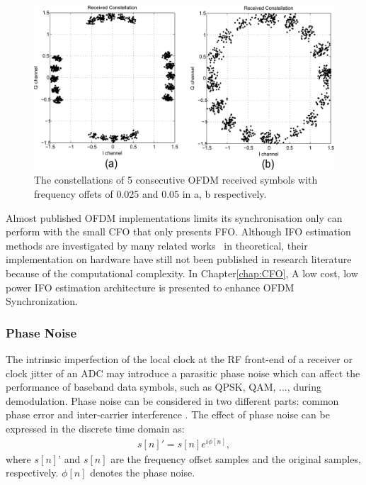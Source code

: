\begin{figure}
	\centerline{\includegraphics [width=0.8\columnwidth] {Figures/freoff_5sym.pdf} }
	\caption{The constellations of 5 consecutive OFDM received symbols with frequency offets of 0.025 and 0.05 in a, b respectively.}
	\label{fig:freoff_5sym}
\end{figure}

Almost published OFDM implementations limits its synchronisation only can perform with the small CFO that only presents FFO.
Although IFO estimation methods are investigated by many related works~\cite{Shim2006,Morelli2008,You2010,Lee2013,Morelli2014} in theoretical, their implementation on hardware have still not been published in research literature because of the computational complexity. In Chapter\ref{chap:CFO}, A low cost, low power IFO estimation architecture is presented to enhance OFDM Synchronization.

\subsubsection{Phase Noise}

The intrinsic imperfection of the local clock at the RF front-end of a receiver or clock jitter of an ADC may introduce a parasitic phase noise which can affect the performance of baseband data symbols, such as QPSK, QAM, ..., during demodulation.
Phase noise can be considered in two different parts: common phase error and inter-carrier interference \cite{Armada1998}. The effect of phase noise can be expressed in the discrete time domain as:
\begin{eqnarray}
\label{equ:}
            s[n]' = s[n] e^{i\phi[n]},
\end{eqnarray}
where $s[n]’$ and $s[n]$ are the frequency offset samples and the original samples, respectively.
$\phi[n]$ denotes the phase noise.

